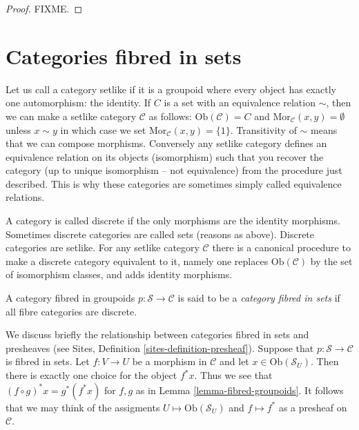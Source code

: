 \begin{proof} 
FIXME.
\end{proof}

\section{Categories fibred in sets}
\label{section-fibred-in-sets}

\noindent
Let us call a category setlike if it is a groupoid where every object
has exactly one automorphism: the identity. If $C$ is a set with an 
equivalence relation $\sim$, then we can make a setlike category
$\mathcal{C}$ as follows: $\text{Ob}(\mathcal{C}) = C$ and 
$\text{Mor}_\mathcal{C}(x,y) = \emptyset$ unless $x \sim y$ in which
case we set $\text{Mor}_\mathcal{C}(x,y) = \{1\}$. Transitivity of
$\sim$ means that we can compose morphisms. Conversely any setlike
category defines an equivalence relation on its objects (isomorphism)
such that you recover the category (up to unique isomorphism -- not
equivalence) from the procedure just described. This is why these categories
are sometimes simply called equivalence relations.

\medskip\noindent
A category is called discrete if the only morphisms are the identity 
morphisms. Sometimes discrete categories are called sets (reasons as above).
Discrete categories are setlike. For any setlike category $\mathcal{C}$
there is a canonical procedure to make a discrete category equivalent to it,
namely one replaces $\text{Ob}(\mathcal{C})$ by the set of isomorphism
classes, and adds identity morphisms.

\begin{definition}
\label{definition-category-fibred-sets}
A category fibred in groupoids $p : \mathcal{S} \to \mathcal{C}$ is said
to be a {\it category fibred in sets} if all fibre categories are discrete.
\end{definition}

\noindent
We discuss briefly the relationship between categories fibred in sets
and presheaves (see Sites, Definition \ref{sites-definition-presheaf}).
Suppose that $p :
\mathcal{S} \to \mathcal{C}$ is fibred in sets. Let $f : V \to U$
be a morphism in $\mathcal{C}$ and let $x \in \text{Ob}(\mathcal{S}_U)$.
Then there is exactly one choice for the object $f^\ast x$. Thus we see that
$(f \circ g)^\ast x = g^\ast(f^\ast x)$ for $f,g$ as in Lemma
\ref{lemma-fibred-groupoids}. It follows that we may think of the
assigments $U \mapsto \text{Ob}(\mathcal{S}_U)$ and $f \mapsto f^\ast$
as a presheaf on $\mathcal{C}$.

